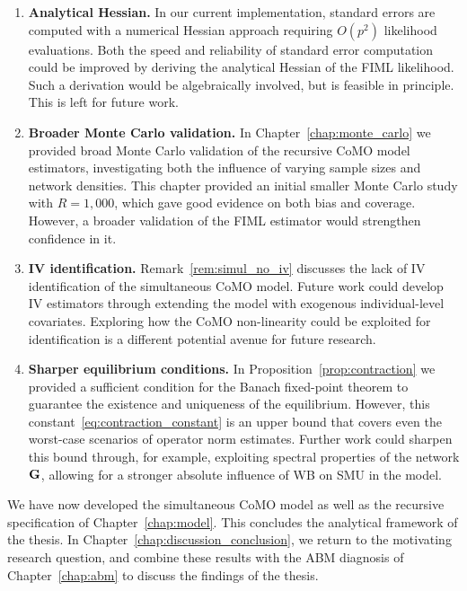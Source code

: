 \begin{enumerate}
    \item \textbf{Analytical Hessian.} In our current implementation, standard errors are computed with a numerical Hessian approach requiring $O(p^2)$ likelihood evaluations. Both the speed and reliability of standard error computation could be improved by deriving the analytical Hessian of the FIML likelihood. Such a derivation would be algebraically involved, but is feasible in principle. This is left for future work.

    \item \textbf{Broader Monte Carlo validation.} In Chapter~\ref{chap:monte_carlo} we provided broad Monte Carlo validation of the recursive CoMO model estimators, investigating both the influence of varying sample sizes and network densities. This chapter provided an initial smaller Monte Carlo study with $R = 1{,}000$, which gave good evidence on both bias and coverage. However, a broader validation of the FIML estimator would strengthen confidence in it.

    \item \textbf{IV identification.} Remark~\ref{rem:simul_no_iv} discusses the lack of IV identification of the simultaneous CoMO model. Future work could develop IV estimators through extending the model with exogenous individual-level covariates. Exploring how the CoMO non-linearity could be exploited for identification is a different potential avenue for future research.

    \item \textbf{Sharper equilibrium conditions.} In Proposition~\ref{prop:contraction} we provided a sufficient condition for the Banach fixed-point theorem to guarantee the existence and uniqueness of the equilibrium. However, this constant~\eqref{eq:contraction_constant} is an upper bound that covers even the worst-case scenarios of operator norm estimates. Further work could sharpen this bound through, for example, exploiting spectral properties of the network $\mathbf{G}$, allowing for a stronger absolute influence of WB on SMU in the model.
\end{enumerate}

We have now developed the simultaneous CoMO model as well as the recursive specification of Chapter~\ref{chap:model}. This concludes the analytical framework of the thesis. In Chapter~\ref{chap:discussion_conclusion}, we return to the motivating research question, and combine these results with the ABM diagnosis of Chapter~\ref{chap:abm} to discuss the findings of the thesis.
